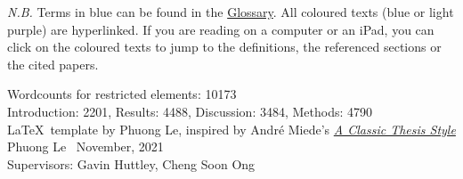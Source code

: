 \thispagestyle{empty}

\textit{N.B.} Terms in blue can be found in the \hyperref[glossary]{Glossary}. All coloured texts (blue or light purple) are hyperlinked. If you are reading on a computer or an iPad, you can click on the coloured texts to jump to the definitions, the referenced sections or the cited papers.

\vfill
\normalsize
Wordcounts for restricted elements: 10173 \\
Introduction: 2201, Results: 4488, Discussion: 3484, Methods: 4790 \\
\LaTeX\ template by 
Phuong Le, inspired by André Miede's \href{https://bitbucket.org/amiede/classicthesis/wiki/Home}{\textit{A Classic Thesis Style}} \\
Phuong Le \textcopyright\ November, 2021 \\
Supervisors: Gavin Huttley, Cheng Soon Ong

\newpage